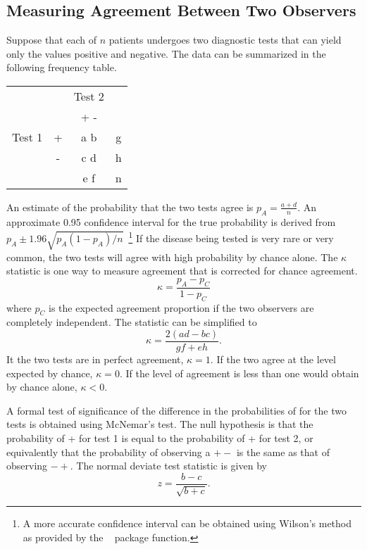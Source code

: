 \subsection{Measuring Agreement Between Two Observers}
Suppose that each of $n$ patients undergoes two diagnostic tests that can
yield only the values positive and negative. The data can be summarized in
the following frequency table.
\begin{center}\begin{tabular}{cccc}
& & Test 2 & \\
      &   & + - &  \\
Test 1    & + & a b & g\\
          & - & c d & h\\
          &   & e f & n
\end{tabular}\end{center}
An estimate of the probability that the two tests agree is 
$p_{A}=\frac{a+d}{n}$. An approximate 0.95
confidence interval for the true probability is derived from
$p_{A} \pm 1.96 \sqrt{p_{A} (1 - p_{A})/n}$~\footnote{A more accurate confidence 
interval can be obtained using Wilson's method as provided by the \R\
 package  function.}
If the disease being tested is very rare or very common, the two tests
will agree with high probability by chance alone. The $\kappa$ statistic is one 
way to measure agreement that is corrected for chance agreement.
\begin{equation}
\kappa = \frac{p_{A} - p_{C}}{1 - p_{C}}
\end{equation}
where $p_{C}$ is the expected agreement proportion if the two observers are
completely independent. The statistic can be simplified to
\begin{equation}
\kappa = \frac{2 (ad - bc)}{gf + eh}.
\end{equation}
It the two tests are in perfect agreement, $\kappa=1$. If the two agree at the 
level
expected by chance, $\kappa=0$. If the level of agreement is less than one would
obtain by chance alone, $\kappa < 0$.

A formal test of significance of the difference in the probabilities of
for the two tests is obtained using McNemar's test. The null hypothesis is
that the probability of + for test 1 is equal to the probability of + for test
2, or equivalently that the probability of observing a $+-$ is the same as that
of observing $-+$. The normal deviate test statistic is given by
\begin{equation}
z = \frac{b - c}{\sqrt{b + c}}.
\end{equation}


